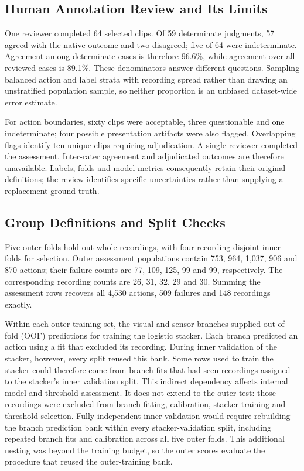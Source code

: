 \subsection{Human Annotation Review and Its Limits}
One reviewer completed 64 selected clips. Of 59 determinate judgments, 57 agreed with the native outcome and two disagreed; five of 64 were indeterminate. Agreement among determinate cases is therefore 96.6\%, while agreement over all reviewed cases is 89.1\%. These denominators answer different questions. Sampling balanced action and label strata with recording spread rather than drawing an unstratified population sample, so neither proportion is an unbiased dataset-wide error estimate.

For action boundaries, sixty clips were acceptable, three questionable and one indeterminate; four possible presentation artifacts were also flagged. Overlapping flags identify ten unique clips requiring adjudication. A single reviewer completed the assessment. Inter-rater agreement and adjudicated outcomes are therefore unavailable. Labels, folds and model metrics consequently retain their original definitions; the review identifies specific uncertainties rather than supplying a replacement ground truth.

\subsection{Group Definitions and Split Checks}
Five outer folds hold out whole recordings, with four recording-disjoint inner folds for selection. Outer assessment populations contain 753, 964, 1,037, 906 and 870 actions; their failure counts are 77, 109, 125, 99 and 99, respectively. The corresponding recording counts are 26, 31, 32, 29 and 30. Summing the assessment rows recovers all 4,530 actions, 509 failures and 148 recordings exactly.

Within each outer training set, the visual and sensor branches supplied out-of-fold (OOF) predictions for training the logistic stacker. Each branch predicted an action using a fit that excluded its recording. During inner validation of the stacker, however, every split reused this bank. Some rows used to train the stacker could therefore come from branch fits that had seen recordings assigned to the stacker's inner validation split. This indirect dependency affects internal model and threshold assessment. It does not extend to the outer test: those recordings were excluded from branch fitting, calibration, stacker training and threshold selection. Fully independent inner validation would require rebuilding the branch prediction bank within every stacker-validation split, including repeated branch fits and calibration across all five outer folds. This additional nesting was beyond the training budget, so the outer scores evaluate the procedure that reused the outer-training bank.

